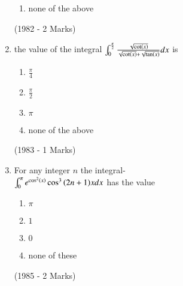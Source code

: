 \documentclass[journal,12pt,twocolumn]{IEEEtran}
\theoremstyle{remark}
\begin{document}
\begin{enumerate}
\begin{enumerate}
			\item none of the above
		        \end{enumerate}
		\hfill{(1982 - 2 Marks)}
	\item the value of the integral $\int_0^{\frac{\pi}{2}} \frac{\sqrt{\cot\left(x\right)}}{\sqrt{\cot\left(x\right)}+\sqrt{\tan\left(x\right)}}dx$ is 
	                \begin{enumerate}
			\item $\frac{\pi}{4}$
		\item$\frac{\pi}{2}$
			\item$\pi$
		\item none of the above
		         \end{enumerate}
		\hfill{(1983 - 1 Marks)}
	\item For any integer $n$ the integral-\\
		$\int_0^{\pi} e^{\cos^2 \left(x\right)} \cos ^3 {\left(2n+1\right)}xdx$ has the value
                        \begin{enumerate}
			\item	$\pi$
			\item $1$
			\item $0$
			\item none of these
		        \end{enumerate}
		\hfill{(1985 - 2 Marks)}
\end{enumerate}
\end{document}
